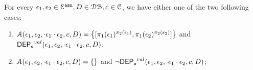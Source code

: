%
\begin{lem}
\label{lem:inv_alg2}
For every $\mathtt{\epsilon}_1, \mathtt{\epsilon}_2 \in \mathcal{E}^{\mathtt{{asn}}}, D \in \mathcal{DB} , c \in \mathcal{C}$, we have either one of the two following cases:
\begin{enumerate}
  \item $\mathcal{A}(\event_1, \event_2, \cdot \event_1 \cdot \event_2, c, D) = 
  \left\{[\pi_1(\event_1)^{\pi_2(\event_1)}, \pi_1(\event_2)^{\pi_2(\event_2)}] \right \}$ 
  and $\mathsf{DEP_{\mathtt{e}}}^{val}(\mathtt{\epsilon}_1, \mathtt{\epsilon}_2, \cdot \mathtt{\epsilon}_1 \cdot \mathtt{\epsilon}_2, c, D)$.
  \item  $\mathcal{A}(\mathtt{\epsilon}_1, \mathtt{\epsilon}_2, \cdot \mathtt{\epsilon}_1 \cdot \mathtt{\epsilon}_2, c, D) = \{\}$ 
  and $\neg \mathsf{DEP_{\mathtt{e}}}^{val}(\mathtt{\epsilon}_1, \mathtt{\epsilon}_2, \cdot \mathtt{\epsilon}_1 \cdot \mathtt{\epsilon}_2, c, D)$;
\end{enumerate}
\end{lem}
